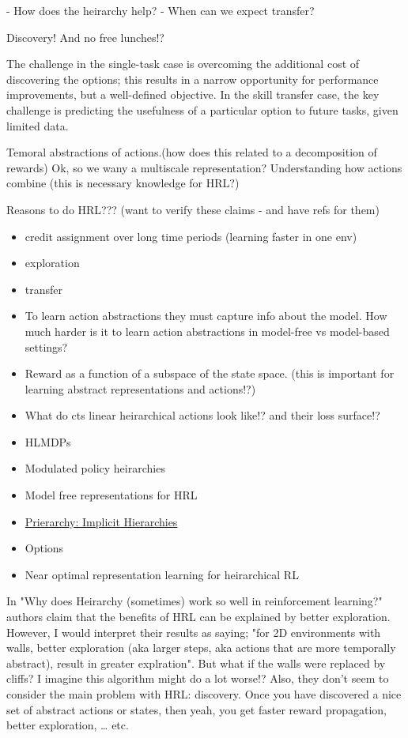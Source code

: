 - How does the heirarchy help?
- When can we expect transfer?

Discovery! And no free lunches!?

\begin{displayquote}
  The challenge in the single-task case is overcoming the additional cost of discovering the options; this results in a narrow opportunity for performance improvements, but a well-defined objective. In the skill transfer case, the key challenge is predicting the usefulness of a particular option to future tasks, given limited data. \cite{Konidaris2019}
\end{displayquote}


Temoral abstractions of actions.(how does this related to a
decomposition of rewards) Ok, so we wany a multiscale representation?
Understanding how actions combine (this is necessary knowledge for HRL?)

Reasons to do HRL??? (want to verify these claims - and have refs for
them)

\begin{itemize}
\item
  credit assignment over long time periods (learning faster in one env)
\item
  exploration
\item
  transfer
\item
  To learn action abstractions they must capture info about the model.
  How much harder is it to learn action abstractions in model-free vs
  model-based settings?
\item
  Reward as a function of a subspace of the state space. (this is
  important for learning abstract representations and actions!?)
\item
  What do cts linear heirarchical actions look like!? and their loss
  surface!?
\item
  HLMDPs \cite{Saxea}
\item
  Modulated policy heirarchies \cite{Pashevich}
\item
  Model free representations for HRL \cite{Rafati}
\item
  \href{https://blog.aqnichol.com/2019/04/03/prierarchy-implicit-hierarchies/}{Prierarchy:
  Implicit Hierarchies}
\item
  Options
\item
  Near optimal representation learning for heirarchical RL \cite{Nachum2018}
\end{itemize}

In "Why does Heirarchy (sometimes) work so well in reinforcement learning?" \cite{Dadashi2018}
authors claim that the benefits of HRL can be explained by better
exploration. However, I would interpret their results as saying; "for
2D environments with walls, better exploration (aka larger steps, aka actions that are more temporally abstract), result in greater
explration". But what if the walls were replaced by cliffs? I imagine
this algorithm might do a lot worse!? Also, they don't seem to consider the main problem with HRL: discovery.
Once you have discovered a nice set of abstract actions or states, then yeah,
you get faster reward propagation, better exploration, \ldots{} etc.
